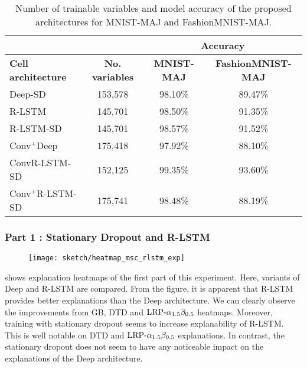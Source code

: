 \renewcommand{\arraystretch}{1.5}
\begin{table}[h]
\begin{center}
\begin{tabular}{lc|c|c|}
\cline{3-4}
& &
\multicolumn{2}{c|}{\parbox{3.5cm}{ \vskip 1mm \centering \textbf{Accuracy} \vskip 1mm}} \\ \hline
\multicolumn{1}{|l|}{\textbf{Cell architecture}} & \textbf{No. variables} & \textbf{MNIST-MAJ} & \textbf{FashionMNIST-MAJ} \\ \hline
\multicolumn{1}{|l|}{Deep-SD}                  & 153,578             & 98.10\% & 89.47\% \\ 
\multicolumn{1}{|l|}{R-LSTM}                    & 145,701   & 98.50\% & 91.35\% \\ 
\multicolumn{1}{|l|}{R-LSTM-SD}              &  145,701                & 98.57\% & 91.52\% \\ 
 \multicolumn{1}{|l|}{Conv$^+$Deep}       & 175,418                 & 97.92\% & 88.10\% \\
 \multicolumn{1}{|l|}{ConvR-LSTM-SD}      & 152,125                 & 99.35\% & 93.60\%  \\ 
\multicolumn{1}{|l|}{Conv$^+$R-LSTM-SD}   & 175,741                & 98.48\% & 88.19\%  \\ \hline 
\end{tabular}

\end{center}
\caption{Number of trainable variables and model accuracy of the  proposed architectures for MNIST-MAJ and FashionMNIST-MAJ.}
\label{tab:maj_exp3_model_acc}
\end{table}
\renewcommand{\arraystretch}{1}


\subsubsection{Part 1 : Stationary Dropout and R-LSTM}
 \begin{figure}[!htb]
\centering
\texttt{[image: sketch/heatmap\_msc\_rlstm\_exp]}
\label{fig:heatmap_msc_rlstm_exp}
\end{figure}

\addfigure{\ref{fig:heatmap_msc_rlstm_exp}} shows explanation heatmaps of the first part of this experiment. Here, variants of Deep and R-LSTM are compared. From the figure, it is apparent that R-LSTM provides better explanations than the Deep architecture. We can clearly observe the improvements from GB, DTD and $\text{LRP-}\alpha_{1.5}\beta_{0.5}$ heatmaps. Moreover, training with stationary dropout seems to increase explanability of  R-LSTM. This is well notable on DTD and $\text{LRP-}\alpha_{1.5}\beta_{0.5}$ explanations. In contrast, the stationary dropout does not seem to have any noticeable impact on the explanations of the Deep architecture.


